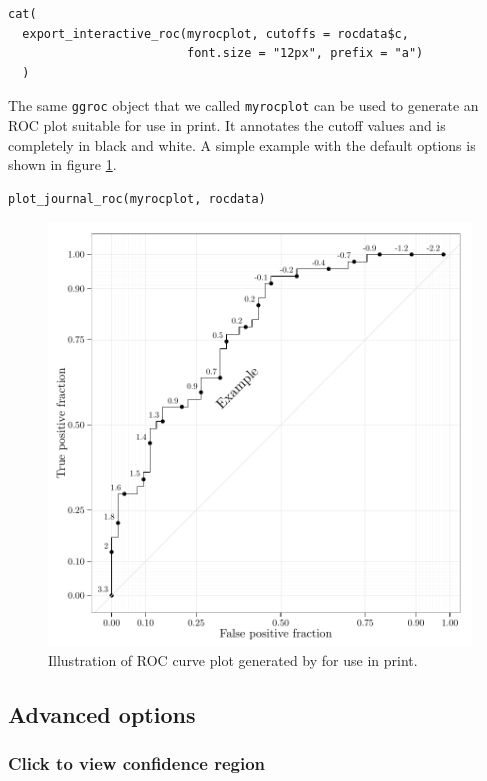 \documentclass[article]{jss}
\begin{document}
\begin{verbatim}
cat(
  export_interactive_roc(myrocplot, cutoffs = rocdata$c, 
                         font.size = "12px", prefix = "a")
  )
\end{verbatim}

The same \texttt{ggroc} object that we called \texttt{myrocplot} can be
used to generate an ROC plot suitable for use in print. It annotates the
cutoff values and is completely in black and white. A simple example
with the default options is shown in figure \ref{first}.

\begin{verbatim}
plot_journal_roc(myrocplot, rocdata)
\end{verbatim}

\begin{figure}[htbp]
\centering
\includegraphics{figure/print-1.pdf}
\caption{Illustration of ROC curve plot generated by  for
use in print. \label{first}}
\end{figure}

\subsection{Advanced options}\label{advanced-options}

\subsubsection{Click to view confidence
region}\label{click-to-view-confidence-region}
\end{document}
